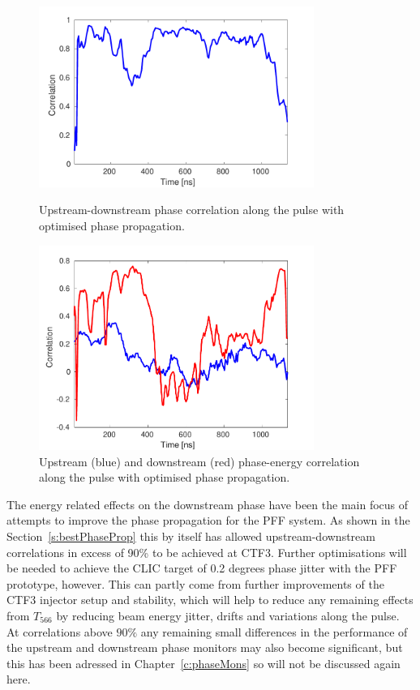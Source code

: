 \begin{figure}
  \centering
  \includegraphics[width=0.8\textwidth]{Figures/propagation/bestProp_corrAlong}
  \caption{Upstream-downstream phase correlation along the pulse with optimised phase propagation.}
  \label{f:bestProp_corrAlong}
  \includegraphics[width=0.8\textwidth]{Figures/propagation/bestProp_enCorrAlong}
  \caption{Upstream (blue) and downstream (red) phase-energy correlation along the pulse with optimised phase propagation.}
  \label{f:bestProp_enCorrAlong}
\end{figure}


The energy related effects on the downstream phase have been the main focus of attempts to improve the phase propagation for the PFF system. As shown in the Section~\ref{s:bestPhaseProp} this by itself has allowed upstream-downstream correlations in excess of 90\% to be achieved at CTF3. Further optimisations will be needed to achieve the CLIC target of 0.2 degrees phase jitter with the PFF prototype, however. This can partly come from further improvements of the CTF3 injector setup and stability, which will help to reduce any remaining effects from \(T_{566}\) by reducing beam energy jitter, drifts and variations along the pulse. At correlations above \(90\%\) any remaining small differences in the performance of the upstream and downstream phase monitors may also become significant, but this has been adressed in Chapter~\ref{c:phaseMons} so will not be discussed again here.

